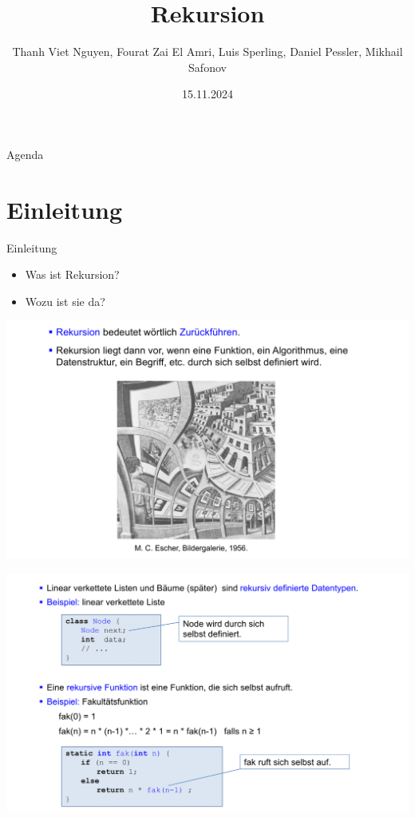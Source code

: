 \documentclass{beamer}
\title{Rekursion}
\author{Thanh Viet Nguyen, Fourat Zai El Amri, Luis Sperling,
Daniel Pessler, Mikhail Safonov}
\institute[]{Hochschule Hannover}
\date{15.11.2024}
\begin{document}
\logo{}
\begin{frame}
    \titlepage 
\end{frame}


\begin{frame}{Agenda}
    \tableofcontents
\end{frame}


\section{Einleitung}
\begin{frame}{Einleitung}
\begin{itemize}
    \item Was ist Rekursion?
    \item Wozu ist sie da?
\end{itemize}
\end{frame}
\begin{frame}
    \begin{center}
           \includegraphics[width=1.1\textwidth]{rekursion anlage/07_Rekursion-02.png}
    \end{center}
\end{frame}
\begin{frame}
    \begin{center}
           \includegraphics[width=1.1\textwidth]{rekursion anlage/07_Rekursion-03.png}
    \end{center}
\end{frame}
\end{document}

